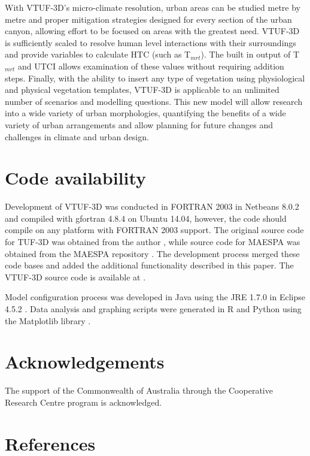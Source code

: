 \documentclass[final,3p,times,authoryear]{elsarticle}
\begin{document}
With VTUF-3D's micro-climate resolution, urban areas can be studied metre by metre and proper mitigation strategies designed for every section of the urban canyon, allowing effort to be focused on areas with the greatest need. VTUF-3D is sufficiently scaled to resolve human level interactions with their surroundings and provide variables to calculate HTC (such as T$_{mrt}$). The built in output of T$_{mrt}$ and UTCI allows examination of these values without requiring addition steps. Finally, with the ability to insert any type of vegetation using physiological and physical vegetation templates, VTUF-3D is applicable to an unlimited number of scenarios and modelling questions. This new model will allow research into a wide variety of urban morphologies, quantifying the benefits of a wide variety of urban arrangements and allow planning for future changes and challenges in climate and urban design.

\section{Code availability}\label{sec:available}

Development of VTUF-3D was conducted in FORTRAN 2003 \citep{GNU2016a} in Netbeans 8.0.2 \citep{Netbeans2016} and compiled with gfortran 4.8.4 \citep{GNU2016} on Ubuntu 14.04, however, the code should compile on any platform with FORTRAN 2003 support. The original source code for TUF-3D was obtained from the author \citep{Krayenhoff2007}, while source code for MAESPA was obtained from the MAESPA repository \citep{Duursma2016}. The development process merged these code bases and added the additional functionality described in this paper. The VTUF-3D source code is available at \cite{Nice2016c}.

Model configuration process was developed in Java using the JRE 1.7.0 \citep{Oracle2016} in Eclipse 4.5.2 \citep{Eclipse2016}. Data analysis and graphing scripts were generated in R \citep{R2013} and Python \citep{Python2016} using the Matplotlib library \citep{Hunter2007}. 

\section*{Acknowledgements}
The support of the Commonwealth of Australia through the Cooperative Research Centre program is acknowledged.

\section*{References}\label{sec:ref}
   
  
\end{document}
